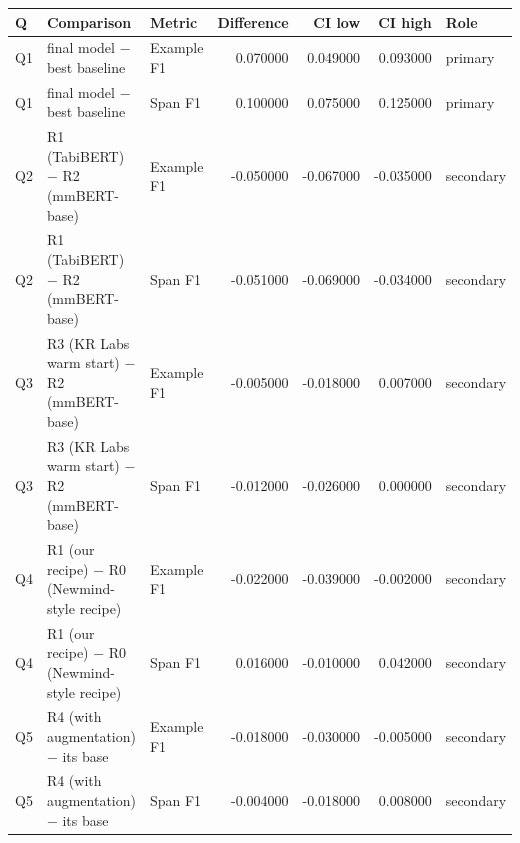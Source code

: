 \begin{tabular}{lllrrrl}
\toprule
Q & Comparison & Metric & Difference & CI low & CI high & Role \\
\midrule
Q1 & final model − best baseline & Example F1 & 0.070000 & 0.049000 & 0.093000 & primary \\
Q1 & final model − best baseline & Span F1 & 0.100000 & 0.075000 & 0.125000 & primary \\
Q2 & R1 (TabiBERT) − R2 (mmBERT-base) & Example F1 & -0.050000 & -0.067000 & -0.035000 & secondary \\
Q2 & R1 (TabiBERT) − R2 (mmBERT-base) & Span F1 & -0.051000 & -0.069000 & -0.034000 & secondary \\
Q3 & R3 (KR Labs warm start) − R2 (mmBERT-base) & Example F1 & -0.005000 & -0.018000 & 0.007000 & secondary \\
Q3 & R3 (KR Labs warm start) − R2 (mmBERT-base) & Span F1 & -0.012000 & -0.026000 & 0.000000 & secondary \\
Q4 & R1 (our recipe) − R0 (Newmind-style recipe) & Example F1 & -0.022000 & -0.039000 & -0.002000 & secondary \\
Q4 & R1 (our recipe) − R0 (Newmind-style recipe) & Span F1 & 0.016000 & -0.010000 & 0.042000 & secondary \\
Q5 & R4 (with augmentation) − its base & Example F1 & -0.018000 & -0.030000 & -0.005000 & secondary \\
Q5 & R4 (with augmentation) − its base & Span F1 & -0.004000 & -0.018000 & 0.008000 & secondary \\
\bottomrule
\end{tabular}
